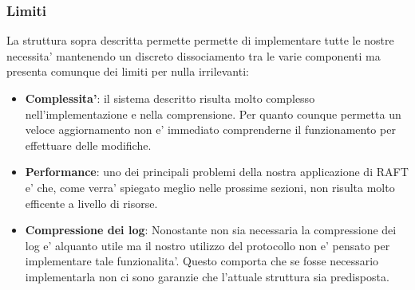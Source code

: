 \subsubsection{Limiti}
La struttura sopra descritta permette permette di implementare tutte le nostre necessita' 
mantenendo un discreto dissociamento tra le varie componenti ma presenta comunque dei limiti
per nulla irrilevanti:
\begin{itemize}
    \item \textbf{Complessita'}: il sistema descritto risulta molto complesso nell'implementazione 
        e nella comprensione. Per quanto counque permetta un veloce aggiornamento non e' 
        immediato comprenderne il funzionamento per effettuare delle modifiche.
    \item \textbf{Performance}: uno dei principali problemi della nostra applicazione di RAFT 
        e' che, come verra' spiegato meglio nelle prossime sezioni, non risulta molto efficente
        a livello di risorse. 
    \item \textbf{Compressione dei log}: Nonostante non sia necessaria la compressione dei log
        e' alquanto utile ma il nostro utilizzo del protocollo non e' pensato per implementare
        tale funzionalita'. Questo comporta che se fosse necessario implementarla
        non ci sono garanzie che l'attuale struttura sia predisposta.
\end{itemize}

